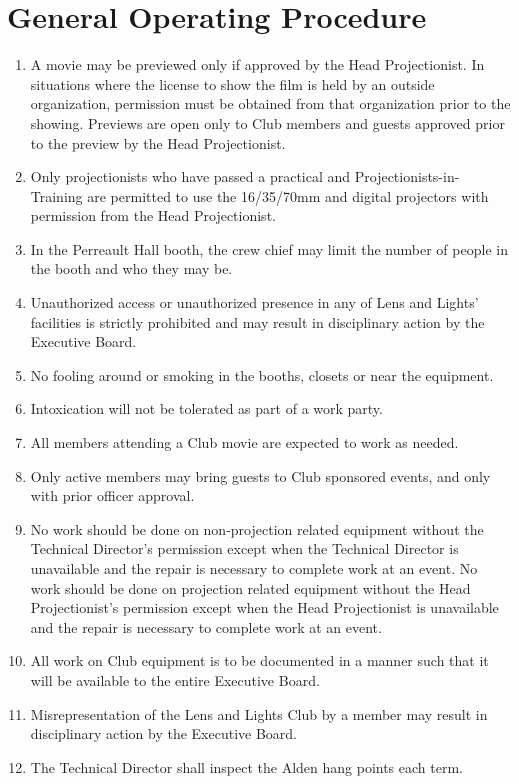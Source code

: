 \documentclass[12pt,letterpaper]{book}
\begin{document}
\section{General Operating Procedure}

\begin{enumerate}

\item A movie may be previewed only if approved by the Head Projectionist. In situations where the license to show the film is held by an outside organization, permission must be obtained from that organization prior to the showing. Previews are open only to Club members and guests approved prior to the preview by the Head Projectionist.
\item Only projectionists who have passed a practical and Projectionists-in-Training are permitted to use the 16/35/70mm and digital projectors with permission from the Head Projectionist.
\item In the Perreault Hall booth, the crew chief may limit the number of people in the booth and who they may be.
\item Unauthorized access or unauthorized presence in any of Lens and Lights' facilities is strictly prohibited and may result in disciplinary action by the Executive Board.
\item No fooling around or smoking in the booths, closets or near the equipment.
\item Intoxication will not be tolerated as part of a work party.
\item All members attending a Club movie are expected to work as needed.
\item Only active members may bring guests to Club sponsored events, and only with prior officer approval.
\item No work should be done on non-projection related equipment without the Technical Director's permission except when the Technical Director is unavailable and the repair is necessary to complete work at an event. No work should be done on projection related equipment without the Head Projectionist's permission except when the Head Projectionist is unavailable and the repair is necessary to complete work at an event.
\item All work on Club equipment is to be documented in a manner such that it will be available to the entire Executive Board.
\item Misrepresentation of the Lens and Lights Club by a member may result in disciplinary action by the Executive Board.
\item The Technical Director shall inspect the Alden hang points each term.

\end{enumerate}
\end{document}
